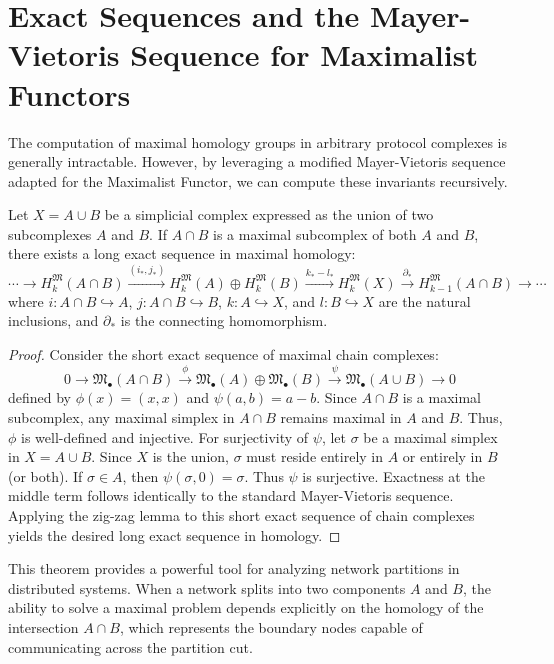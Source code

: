 \section{Exact Sequences and the Mayer-Vietoris Sequence for Maximalist Functors}

The computation of maximal homology groups in arbitrary protocol complexes is generally intractable. However, by leveraging a modified Mayer-Vietoris sequence adapted for the Maximalist Functor, we can compute these invariants recursively.

\begin{theorem}
Let $X = A \cup B$ be a simplicial complex expressed as the union of two subcomplexes $A$ and $B$. If $A \cap B$ is a maximal subcomplex of both $A$ and $B$, there exists a long exact sequence in maximal homology:
\[
\cdots \to H_k^{\mathfrak{M}}(A \cap B) \xrightarrow{(i_*, j_*)} H_k^{\mathfrak{M}}(A) \oplus H_k^{\mathfrak{M}}(B) \xrightarrow{k_* - l_*} H_k^{\mathfrak{M}}(X) \xrightarrow{\partial_*} H_{k-1}^{\mathfrak{M}}(A \cap B) \to \cdots
\]
where $i: A \cap B \hookrightarrow A$, $j: A \cap B \hookrightarrow B$, $k: A \hookrightarrow X$, and $l: B \hookrightarrow X$ are the natural inclusions, and $\partial_*$ is the connecting homomorphism.
\end{theorem}

\begin{proof}
Consider the short exact sequence of maximal chain complexes:
\[
0 \to \mathfrak{M}_\bullet(A \cap B) \xrightarrow{\phi} \mathfrak{M}_\bullet(A) \oplus \mathfrak{M}_\bullet(B) \xrightarrow{\psi} \mathfrak{M}_\bullet(A \cup B) \to 0
\]
defined by $\phi(x) = (x, x)$ and $\psi(a, b) = a - b$. 
Since $A \cap B$ is a maximal subcomplex, any maximal simplex in $A \cap B$ remains maximal in $A$ and $B$. Thus, $\phi$ is well-defined and injective. 
For surjectivity of $\psi$, let $\sigma$ be a maximal simplex in $X = A \cup B$. Since $X$ is the union, $\sigma$ must reside entirely in $A$ or entirely in $B$ (or both). If $\sigma \in A$, then $\psi(\sigma, 0) = \sigma$. Thus $\psi$ is surjective.
Exactness at the middle term follows identically to the standard Mayer-Vietoris sequence. Applying the zig-zag lemma to this short exact sequence of chain complexes yields the desired long exact sequence in homology.
\end{proof}

This theorem provides a powerful tool for analyzing network partitions in distributed systems. When a network splits into two components $A$ and $B$, the ability to solve a maximal problem depends explicitly on the homology of the intersection $A \cap B$, which represents the boundary nodes capable of communicating across the partition cut.

